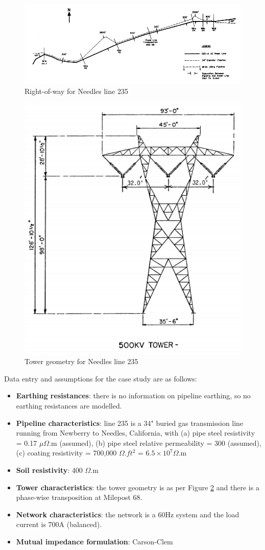 \documentclass{article}
\begin{document}
\begin{figure}[!htp]
\begin{center}
\caption{Right-of-way for Needles line 235 \cite{taflove_1979}}
\label{fig:needles_row}
\includegraphics[width=\linewidth]{./Figures/needles_row.png}
\end{center}
\end{figure}

\begin{figure}[!htp]
\begin{center}
\caption{Tower geometry for Needles line 235 \cite{taflove_1979}}
\label{fig:needles_geo}
\includegraphics[width=0.4\linewidth]{./Figures/needles_geo.png}
\end{center}
\end{figure}

Data entry and assumptions for the case study are as follows:
\begin{itemize}
\item \textbf{Earthing resistances}: there is no information on pipeline earthing, so no earthing resistances are modelled. 
\item \textbf{Pipeline characteristics}: line 235 is a 34" buried gas transmission line running from Newberry to Needles, California, with (a) pipe steel resistivity = 0.17 $\mu\Omega$.m (assumed), (b) pipe steel relative permeability = 300 (assumed), (c) coating resistivity = 700,000 $\Omega.ft^{2}$ = $6.5 \times 10^{7} \Omega$.m
\item \textbf{Soil resistivity}: 400 $\Omega$.m
\item \textbf{Tower characteristics}: the tower geometry is as per Figure \ref{fig:needles_geo} and there is a phase-wise transposition at Milepost 68.
\item \textbf{Network characteristics}: the network is a 60Hz system and the load current is 700A (balanced).
\item \textbf{Mutual impedance formulation}: Carson-Clem
\end{itemize}
\end{document}
